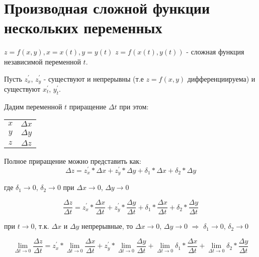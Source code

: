 \section{Производная сложной функции нескольких переменных}

\begin{theorem}[\rom{1}]
    $z=f(x,y), x=x(t), y=y(t)$
    \newline $z=f(x(t), y(t))$ - сложная функция независимой переменной $t$.
\end{theorem}

    Пусть $z_{x}^{'}$, $z_{y}^{'}$ - существуют и непрерывны (т.е $z=f(x,y)$ дифференциируема) и существуют $x_{t}^{'}$, $y_{t}^{'}$.
    
    Дадим переменной $t$ приращение $\Delta{t}$ при этом:
    \begin{tabular}{c|c}
        $x$ & $\Delta{x}$ \\
        $y$ & $\Delta{y}$ \\
        $z$ & $\Delta{z}$
    \end{tabular}
    
    Полное приращение можно представить как: 
    \begin{equation*}
        \Delta{z} = z_{x}^{'} * \Delta{x} + z_{y}^{'} * \Delta{y} + \delta{}_{1} * \Delta{x} + \delta{}_{2} * \Delta{y}
    \end{equation*}
    
    где $\delta{}_{1} \longrightarrow 0$, $\delta{}_{2} \longrightarrow 0$ при $\Delta{x} \longrightarrow 0$, $\Delta{y} \longrightarrow 0$
    
    \begin{equation}
        \frac{\Delta{z}}{\Delta{t}} = z_{x}^{'} * \frac{\Delta{x}}{\Delta{t}} + z_{y}^{'} * \frac{\Delta{y}}{\Delta{t}} + \delta{}_{1} * \frac{\Delta{x}}{\Delta{t}} + \delta{}_{2} * \frac{\Delta{y}}{\Delta{t}}
    \end{equation}
    
    при $t \longrightarrow 0$, т.к. $\Delta{x}$ и $\Delta{y}$ непрерывные, то $\Delta{x} \longrightarrow 0$, $\Delta{y} \longrightarrow 0$ $\Rightarrow$ $\delta{}_{1} \longrightarrow 0$, $\delta{}_{2} \longrightarrow 0$
    
    \begin{equation*}
        \lim_{\Delta{t}\to 0} \frac{\Delta{z}}{\Delta{t}} = z_{x}^{'} * \lim_{\Delta{t}\to 0} \frac{\Delta{x}}{\Delta{t}} + z_{y}^{'} * \lim_{\Delta{t}\to 0} \frac{\Delta{y}}{\Delta{t}} + \lim_{\Delta{t}\to 0} \delta{}_{1} * \frac{\Delta{x}}{\Delta{t}} + \lim_{\Delta{t}\to 0} \delta{}_{2} * \frac{\Delta{y}}{\Delta{t}}
    \end{equation*}
    
